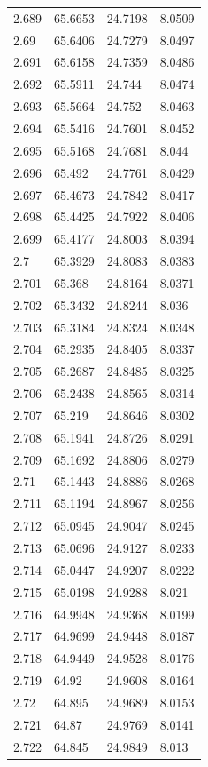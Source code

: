 \begin{tabular}{llll}
2.689 & 65.6653 & 24.7198 & 8.0509 \\
2.69 & 65.6406 & 24.7279 & 8.0497 \\
2.691 & 65.6158 & 24.7359 & 8.0486 \\
2.692 & 65.5911 & 24.744 & 8.0474 \\
2.693 & 65.5664 & 24.752 & 8.0463 \\
2.694 & 65.5416 & 24.7601 & 8.0452 \\
2.695 & 65.5168 & 24.7681 & 8.044 \\
2.696 & 65.492 & 24.7761 & 8.0429 \\
2.697 & 65.4673 & 24.7842 & 8.0417 \\
2.698 & 65.4425 & 24.7922 & 8.0406 \\
2.699 & 65.4177 & 24.8003 & 8.0394 \\
2.7 & 65.3929 & 24.8083 & 8.0383 \\
2.701 & 65.368 & 24.8164 & 8.0371 \\
2.702 & 65.3432 & 24.8244 & 8.036 \\
2.703 & 65.3184 & 24.8324 & 8.0348 \\
2.704 & 65.2935 & 24.8405 & 8.0337 \\
2.705 & 65.2687 & 24.8485 & 8.0325 \\
2.706 & 65.2438 & 24.8565 & 8.0314 \\
2.707 & 65.219 & 24.8646 & 8.0302 \\
2.708 & 65.1941 & 24.8726 & 8.0291 \\
2.709 & 65.1692 & 24.8806 & 8.0279 \\
2.71 & 65.1443 & 24.8886 & 8.0268 \\
2.711 & 65.1194 & 24.8967 & 8.0256 \\
2.712 & 65.0945 & 24.9047 & 8.0245 \\
2.713 & 65.0696 & 24.9127 & 8.0233 \\
2.714 & 65.0447 & 24.9207 & 8.0222 \\
2.715 & 65.0198 & 24.9288 & 8.021 \\
2.716 & 64.9948 & 24.9368 & 8.0199 \\
2.717 & 64.9699 & 24.9448 & 8.0187 \\
2.718 & 64.9449 & 24.9528 & 8.0176 \\
2.719 & 64.92 & 24.9608 & 8.0164 \\
2.72 & 64.895 & 24.9689 & 8.0153 \\
2.721 & 64.87 & 24.9769 & 8.0141 \\
2.722 & 64.845 & 24.9849 & 8.013 \\

\end{tabular}
